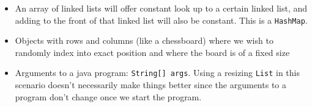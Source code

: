 \begin{blocksection}
\begin{parts}
\begin{solution}[1.25in]
\begin{itemize}
\item An array of linked lists will offer constant look up to a certain linked
list, and adding to the front of that linked list will also be constant. This
is a \lstinline$HashMap$.
\item Objects with rows and columns (like a chessboard) where we wish to
randomly index into exact position and where the board is of a fixed size
\item Arguments to a java program: \lstinline$String[] args$. Using a resizing
\lstinline$List$ in this scenario doesn't necessarily make things better since
the arguments to a program don't change once we start the program.
\end{itemize}
\end{solution}
\end{parts}
\end{blocksection}
